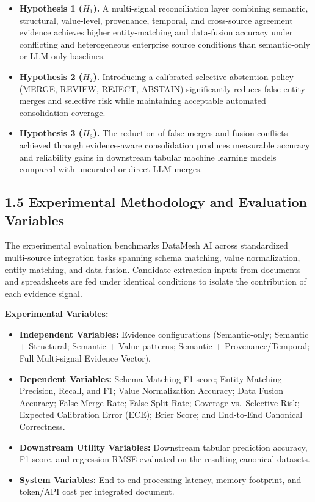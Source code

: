 \documentclass[12pt,a4paper]{article}
\begin{document}
\begin{itemize}
  \item \textbf{Hypothesis 1 ($H_1$).} A multi-signal reconciliation layer combining semantic, structural, value-level, provenance, temporal, and cross-source agreement evidence achieves higher entity-matching and data-fusion accuracy under conflicting and heterogeneous enterprise source conditions than semantic-only or LLM-only baselines.
  \item \textbf{Hypothesis 2 ($H_2$).} Introducing a calibrated selective abstention policy (MERGE, REVIEW, REJECT, ABSTAIN) significantly reduces false entity merges and selective risk while maintaining acceptable automated consolidation coverage.
  \item \textbf{Hypothesis 3 ($H_3$).} The reduction of false merges and fusion conflicts achieved through evidence-aware consolidation produces measurable accuracy and reliability gains in downstream tabular machine learning models compared with uncurated or direct LLM merges.
\end{itemize}

\subsection*{1.5 Experimental Methodology and Evaluation Variables}

The experimental evaluation benchmarks DataMesh AI across standardized multi-source integration tasks spanning schema matching, value normalization, entity matching, and data fusion. Candidate extraction inputs from documents and spreadsheets are fed under identical conditions to isolate the contribution of each evidence signal.

\textbf{Experimental Variables:}
\begin{itemize}
  \item \textbf{Independent Variables:} Evidence configurations (Semantic-only; Semantic + Structural; Semantic + Value-patterns; Semantic + Provenance/Temporal; Full Multi-signal Evidence Vector).
  \item \textbf{Dependent Variables:} Schema Matching F1-score; Entity Matching Precision, Recall, and F1; Value Normalization Accuracy; Data Fusion Accuracy; False-Merge Rate; False-Split Rate; Coverage vs.\ Selective Risk; Expected Calibration Error (ECE); Brier Score; and End-to-End Canonical Correctness.
  \item \textbf{Downstream Utility Variables:} Downstream tabular prediction accuracy, F1-score, and regression RMSE evaluated on the resulting canonical datasets.
  \item \textbf{System Variables:} End-to-end processing latency, memory footprint, and token/API cost per integrated document.
\end{itemize}
\end{document}
